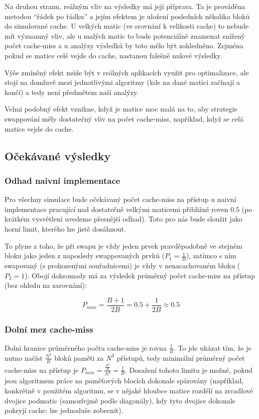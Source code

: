 \documentclass[a4paper,12pt]{article} %
\begin{document}
Na druhou stranu, reálným vliv na výsledky má její příprava. Ta je prováděna metodou ``řádek po řádku'' a jejím efektem je uložení posledních několika bloků do simulované cache. U velkých matic (ve srovnání k velikosti cache) to nebude mít významný vliv, ale u malých matic to bude potenciálně znamenat snížený počet cache-miss a u analýzy výsledků by toto mělo být zohledněno. Zejména pokud se matice celé vejde do cache, nastanou falešně nulové výsledky.

Výše zmíněný efekt může být v reálných aplikacích využit pro optimalizace, ale stojí na domluvě mezi jednotlivými algoritmy (kde na dané matici začínají a končí) a tedy není předmětem naší analýzy.

Velmi podobný efekt vznikne, když je matice moc malá na to, aby strategie swappování měly dostatečný vliv na počet cache-miss, například, když se celá matice vejde do cache.

\subsection{Očekávané výsledky}
\label{expected}

\subsubsection{Odhad naivní implementace}

Pro všechny simulace bude očekávaný počet cache-miss na přístup u naivní implementace pracující nad dostatečně velkými maticemi přibližně roven $0.5$ (po krátkém vysvětlení uvedeme přesnější odhad). Toto pro nás bude sloužit jako horní limit, kterého lze jistě dosáhnout.

To plyne z toho, že při swapu je vždy jeden prvek pravděpodobně ve stejném bloku jako jeden z naposledy swappovaných prvků ($P_1 = \frac{1}{B}$), zatímco s ním swapovaný (s prohozenými souřadnicemi) je vždy v nenacachovaném bloku ($P_2 = 1$). Obojí dohromady má za výsledek průměrný počet cache-miss na přístup (bez ohledu na zarovnání):

\[P_{max} = \frac{B + 1}{2B} = 0.5 + \frac{1}{2B} \approx 0.5\]

\subsubsection{Dolní mez cache-miss}

Dolní hranice průměrného počtu cache-miss je rovna $\frac{1}{B}$. To jde ukázat tím, že je nutno načíst $\frac{N^2}{B}$ bloků paměti za $N^2$ přístupů, tedy minimální průměrný počet cache-miss na přístup je $P_{min} = \frac{\frac{N^2}{B}}{N^2} = \frac{1}{B}$. Dosažení tohoto limitu je možné, pokud jsou algoritmem práce na paměťových blocích dokonale spárovány (například, konkrétně v použitém algoritmu, se v nějaké hloubce matice rozdělí na zrcadlové dvojice podmatic (samozřejmě podle diagonály), kdy tyto dvojice dokonale pokryjí cache; lze jednoduše zobecnit).
\end{document}
